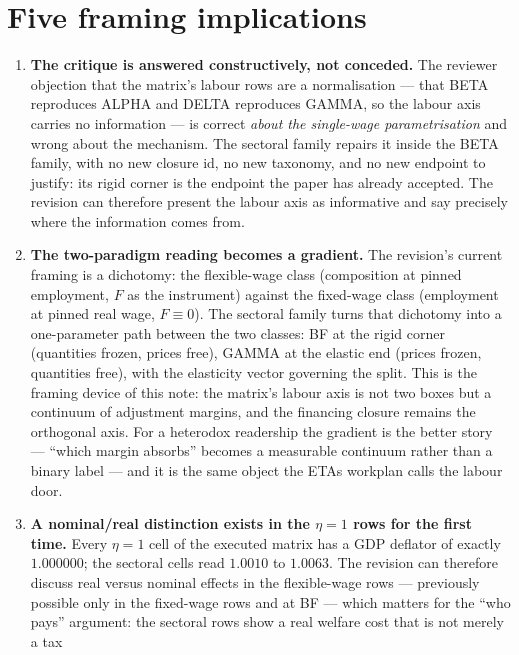 \documentclass[11pt]{article}
\begin{document}
\section{Five framing implications}

\begin{enumerate}
\item \textbf{The critique is answered constructively, not conceded.} The
      reviewer objection that the matrix's labour rows are a normalisation ---
      that BETA reproduces ALPHA and DELTA reproduces GAMMA, so the labour axis
      carries no information --- is correct \emph{about the single-wage
      parametrisation} and wrong about the mechanism. The sectoral family
      repairs it inside the BETA family, with no new closure id, no new
      taxonomy, and no new endpoint to justify: its rigid corner is the
      endpoint the paper has already accepted. The revision can therefore
      present the labour axis as informative and say precisely where the
      information comes from.
\item \textbf{The two-paradigm reading becomes a gradient.} The revision's
      current framing is a dichotomy: the flexible-wage class (composition at
      pinned employment, $F$ as the instrument) against the fixed-wage class
      (employment at pinned real wage, $F \equiv 0$). The sectoral family turns
      that dichotomy into a one-parameter path between the two classes: BF at
      the rigid corner (quantities frozen, prices free), GAMMA at the elastic
      end (prices frozen, quantities free), with the elasticity vector
      governing the split. This is the framing device of this note: the matrix's
      labour axis is not two boxes but a continuum of adjustment margins, and
      the financing closure remains the orthogonal axis. For a heterodox
      readership the gradient is the better story --- ``which margin absorbs''
      becomes a measurable continuum rather than a binary label --- and it is
      the same object the ETAs workplan calls the labour door.
\item \textbf{A nominal/real distinction exists in the $\eta = 1$ rows for the
      first time.} Every $\eta = 1$ cell of the executed matrix has a GDP
      deflator of exactly $1.000000$; the sectoral cells read $1.0010$ to
      $1.0063$. The revision can therefore discuss real versus nominal effects
      in the flexible-wage rows --- previously possible only in the fixed-wage
      rows and at BF --- which matters for the ``who pays'' argument: the
      sectoral rows show a real welfare cost that is not merely a tax

\end{enumerate}
\end{document}
